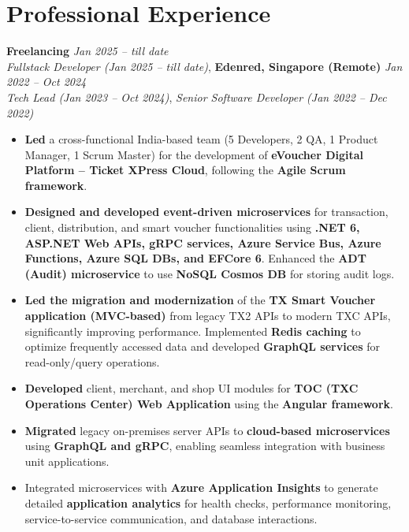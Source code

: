 \documentclass[12pt,a4paper]{article}
\begin{document}
\section*{Professional Experience}

\textbf{Freelancing} \hfill \textit{Jan 2025 -- till date}\\
\textit{Fullstack Developer (Jan 2025 -- till date)},
\newline
\newline
\textbf{Edenred, Singapore (Remote)} \hfill \textit{Jan 2022 -- Oct 2024}\\
\textit{Tech Lead (Jan 2023 -- Oct 2024)},
\newline
\textit{Senior Software Developer (Jan 2022 -- Dec 2022)}
\begin{itemize}
    \item \textbf{Led} a cross-functional India-based team (5 Developers, 2 QA, 1 Product Manager, 1 Scrum Master) for the development of \textbf{eVoucher Digital Platform – Ticket XPress Cloud}, following the \textbf{Agile Scrum framework}. 
    \item \textbf{Designed and developed event-driven microservices} for transaction, client, distribution, and smart voucher functionalities using \textbf{.NET 6, ASP.NET Web APIs, gRPC services, Azure Service Bus, Azure Functions, Azure SQL DBs, and EFCore 6}. Enhanced the \textbf{ADT (Audit) microservice} to use \textbf{NoSQL Cosmos DB} for storing audit logs. 
    \item \textbf{Led the migration and modernization} of the \textbf{TX Smart Voucher application (MVC-based)} from legacy TX2 APIs to modern TXC APIs, significantly improving performance. Implemented \textbf{Redis caching} to optimize frequently accessed data and developed \textbf{GraphQL services} for read-only/query operations. 
    \item \textbf{Developed} client, merchant, and shop UI modules for \textbf{TOC (TXC Operations Center) Web Application} using the \textbf{Angular framework}. 
    \item \textbf{Migrated} legacy on-premises server APIs to \textbf{cloud-based microservices} using \textbf{GraphQL and gRPC}, enabling seamless integration with business unit applications.
    \item Integrated microservices with \textbf{Azure Application Insights} to generate detailed \textbf{application analytics} for health checks, performance monitoring, service-to-service communication, and database interactions.

\end{itemize}
\end{document}
